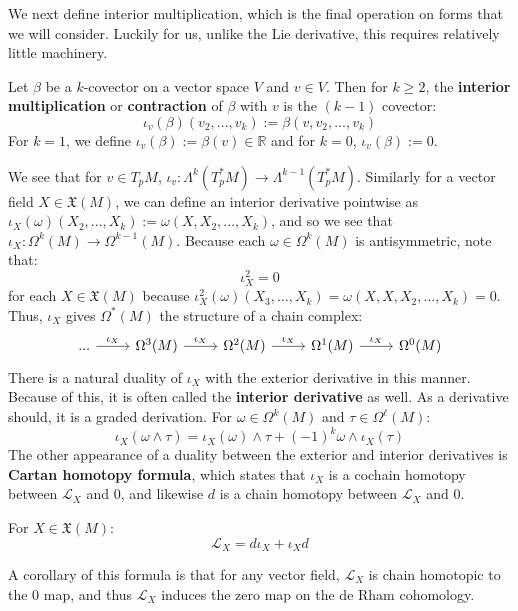 We next define interior multiplication, which is the final operation on forms that we will consider. Luckily for us, unlike the 
Lie derivative, this requires relatively little machinery.
\begin{definition}
	Let $\beta$ be a $k$-covector on a vector space $V$ and $v\in V$. Then for $k\geq 2$, the \textbf{interior multiplication} 
	or \textbf{contraction} of $\beta$ with $v$ is the $(k-1)$ covector:
	\begin{equation}
		\iota_v(\beta)(v_2, ..., v_k) := \beta(v, v_2, ..., v_k)
	\end{equation}
	For $k = 1$, we define $\iota_v(\beta) := \beta(v)\in\mathbb R$ and for $k = 0$, $\iota_v(\beta) := 0$. 
\end{definition}

We see that for $v\in T_p M$, $\iota_v : \Lambda^k(T_p^* M)\rightarrow\Lambda^{k - 1}(T_p^* M)$. Similarly for a 
vector field $X\in\mathfrak X(M)$, we can define an interior derivative pointwise as $\iota_X(\omega)(X_2, ..., X_k) := 
\omega(X, X_2, ..., X_k)$, and so we see that $\iota_X : \Omega^k(M)\rightarrow\Omega^{k - 1}(M)$. Because each 
$\omega\in\Omega^k(M)$ is antisymmetric, note that:
\begin{equation}
	\iota_X^2 = 0
\end{equation}
for each $X\in\mathfrak X(M)$ because $\iota_X^2(\omega)(X_3, ..., X_k) = \omega(X, X, X_2, ..., X_k) = 0$. Thus, 
$\iota_X$ gives $\Omega^*(M)$ the structure of a chain complex:
\begin{equation}\begin{tikzcd}
	...\arrow[r, "\iota_X"] & \Omega^3(M) \arrow[r, "\iota_X"] & \Omega^2(M) \arrow[r, "\iota_X"] & \Omega^1(M) \arrow[r, 
	"\iota_X"] & \Omega^0(M)
\end{tikzcd}\end{equation}
There is a natural duality of $\iota_X$ with the exterior derivative in this manner. Because of this, it is often called the 
\textbf{interior derivative} as well. As a derivative should, it is a graded derivation. For $\omega\in\Omega^k(M)$ and 
$\tau\in\Omega^\ell(M)$:
\begin{equation}
	\iota_X(\omega\wedge\tau) = \iota_X(\omega)\wedge\tau + (-1)^k\omega\wedge\iota_X(\tau)
\end{equation}
The other appearance of a duality between the exterior and interior derivatives is \textbf{Cartan homotopy formula}, which 
states that $\iota_X$ is a cochain homotopy between $\mathcal L_X$ and 0, and likewise $d$ is a chain homotopy between 
$\mathcal L_X$ and 0. 
\begin{theorem}
	For $X\in\mathfrak X(M)$:
	\begin{equation}
		\mathcal L_X = d\iota_X + \iota_X d
	\end{equation}
\end{theorem}
A corollary of this formula is that for any vector field, $\mathcal L_X$ is chain homotopic to the 0 map, and thus $\mathcal 
L_X$ induces the zero map on the de Rham cohomology. 

